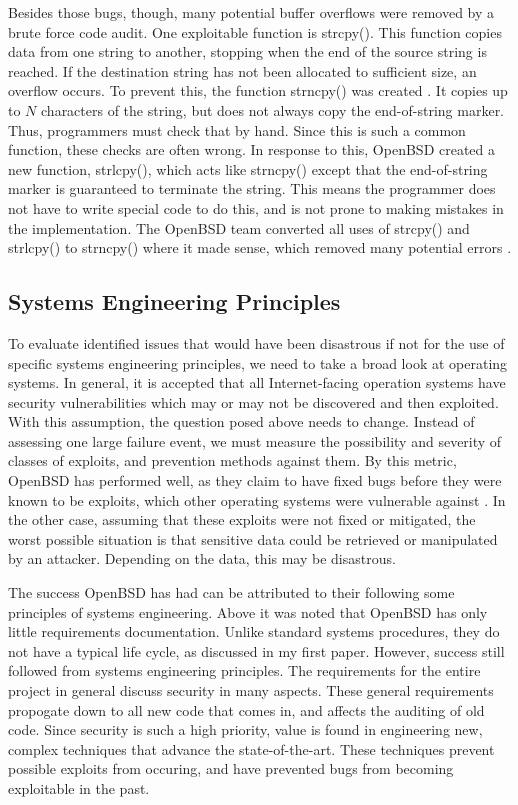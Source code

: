 \documentclass[12pt]{article}
\begin{document}
{Besides those bugs, though, many potential buffer overflows were removed by a brute force code audit. One exploitable function is strcpy(). This function copies data from one string to another, stopping when the end of the source string is reached. If the destination string has not been allocated to sufficient size, an overflow occurs. To prevent this, the function strncpy() was created \cite{strlcpy}. It copies up to $N$ characters of the string, but does not always copy the end-of-string marker. Thus, programmers must check that by hand. Since this is such a common function, these checks are often wrong. In response to this, OpenBSD created a new function, strlcpy(), which acts like strncpy() except that the end-of-string marker is guaranteed to terminate the string. This means the programmer does not have to write special code to do this, and is not prone to making mistakes in the implementation. The OpenBSD team converted all uses of strcpy() and strlcpy() to strncpy() where it made sense, which removed many potential errors \cite{plus33}.

\subsection*{Systems Engineering Principles}

To evaluate identified issues that would have been disastrous if not for the use of specific systems engineering principles, we need to take a broad look at operating systems. In general, it is accepted that all Internet-facing operation systems have security vulnerabilities which may or may not be discovered and then exploited. With this assumption, the question posed above needs to change. Instead of assessing one large failure event, we must measure the possibility and severity of classes of exploits, and prevention methods against them. By this metric, OpenBSD has performed well, as they claim to have fixed bugs before they were known to be exploits, which other operating systems were vulnerable against \cite{security}. In the other case, assuming that these exploits were not fixed or mitigated, the worst possible situation is that sensitive data could be retrieved or manipulated by an attacker. Depending on the data, this may be disastrous.

The success OpenBSD has had can be attributed to their following some principles of systems engineering. Above it was noted that OpenBSD has only little requirements documentation. Unlike standard systems procedures, they do not have a typical life cycle, as discussed in my first paper. However, success still followed from systems engineering principles. The requirements for the entire project in general discuss security in many aspects. These general requirements propogate down to all new code that comes in, and affects the auditing of old code. Since security is such a high priority, value is found in engineering new, complex techniques that advance the state-of-the-art. These techniques prevent possible exploits from occuring, and have prevented bugs from becoming exploitable in the past.

}
\end{document}
